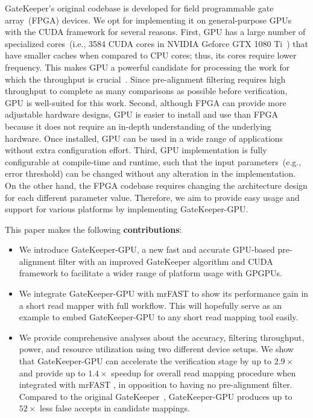 GateKeeper's original codebase is developed for field programmable gate array~(FPGA) devices. We opt for implementing it on general-purpose GPUs with the CUDA framework for several reasons. First, GPU has a large number of specialized cores~(i.e., 3584 CUDA cores in NVIDIA Geforce GTX 1080 Ti~\cite{cudacores}) that have smaller caches when compared to CPU cores; thus, its cores require lower frequency. This makes GPU a powerful candidate for processing the work for which the throughput is crucial~\cite{mittal2015survey}. Since pre-alignment filtering requires high throughput to complete as many comparisons as possible before verification, GPU is well-suited for this work. 
Second, although FPGA can provide more adjustable hardware designs, GPU is easier to install and use than FPGA because it does not require an in-depth understanding of the underlying hardware. Once installed, GPU can be used in a wide range of applications without extra configuration effort.
Third, GPU implementation is fully configurable at compile-time and runtime, such that the input parameters~(e.g., error threshold) can be changed without any alteration in the implementation.
On the other hand, the FPGA codebase requires changing the architecture design for each different parameter value. Therefore, we aim to provide easy usage and support for various platforms by implementing GateKeeper-GPU.

This paper makes the following \textbf{contributions}:
\begin{itemize}
\item We introduce GateKeeper-GPU, a new fast and accurate GPU-based pre-alignment filter with an improved GateKeeper algorithm and CUDA framework to facilitate a wider range of platform usage with GPGPUs.
\item We integrate GateKeeper-GPU with mrFAST to show its performance gain in a short read mapper with full workflow. This will hopefully serve as an example to embed GateKeeper-GPU to any short read mapping tool easily. 
\item We provide comprehensive analyses about the accuracy, filtering throughput, power, and resource utilization using two different device setups. We show that GateKeeper-GPU can accelerate the verification stage by up to $2.9\times$ and provide up to $1.4\times$ speedup for overall read mapping procedure when integrated with mrFAST \cite{alkan2009personalized}, in opposition to having no pre-alignment filter. Compared to the original GateKeeper~\cite{Alser2017}, GateKeeper-GPU produces up to $52\times$ less false accepts in candidate mappings.
\end{itemize}